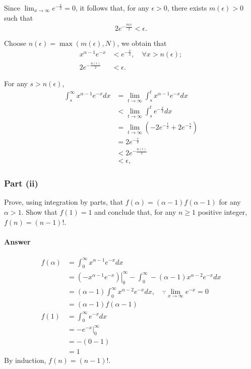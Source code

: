 Since $ \lim_{x \rightarrow \infty} e^{-\frac{x}{2}} = 0 $, it follows that,
    for any $ \epsilon > 0 $, there exists $ m(\epsilon) > 0 $ such that
\begin{equation*}
    2 e^{-\frac{m(\epsilon}{2}} < \epsilon.
\end{equation*}

Choose $ n(\epsilon) = \max (m(\epsilon), N) $, we obtain that
\begin{align*}
    x^{\alpha - 1} e^{-x} &< e^{-\frac{x}{2}}, \quad \forall x > n(\epsilon); \\
    2 e^{-\frac{n(\epsilon)}{2}} &< \epsilon.
\end{align*}

For any $ s > n(\epsilon) $,
\begin{align*}
    \int_{s}^{\infty} x^{\alpha - 1} e^{-x} dx
        &= \lim_{t \rightarrow \infty} \int_{s}^{t} x^{\alpha - 1} e^{-x} dx \\
        &< \lim_{t \rightarrow \infty} \int_{s}^{t} e^{-\frac{x}{2}} dx \\
        &= \lim_{t \rightarrow \infty} \left( -2 e^{-\frac{t}{2}} +
            2 e^{-\frac{s}{2}} \right) \\
        &= 2 e^{-\frac{s}{2}} \\
        &< 2 e^{-\frac{n(\epsilon)}{2}} \\
        &< \epsilon,
\end{align*}

\subsubsection{Part (ii)}
Prove, using integration by parts, that $ f(\alpha) = (\alpha - 1)
    f(\alpha - 1) $ for any $ \alpha > 1 $.
Show that $ f(1) = 1 $ and conclude that, for any $ n \geq 1 $ positive integer,
    $ f(n) = (n - 1)! $.

\paragraph{Answer}
\begin{align*}
    f(\alpha)
        &= \int_{0}^{\infty} x^{\alpha - 1} e^{-x} dx \\
        &= \left. \left( -x^{\alpha - 1} e^{-x} \right) \right|_{0}^{\infty} -
            \int_{0}^{\infty} -(\alpha - 1) x^{\alpha - 2} e^{-x} dx \\
        &= (\alpha - 1) \int_{0}^{\infty} x^{\alpha - 2} e^{-x} dx, \quad
            \because \lim_{x \rightarrow \infty} e^{-x} = 0 \\
        &= (\alpha - 1) f(\alpha - 1) \\
    f(1)
        &= \int_{0}^{\infty} e^{-x} dx \\
        &= -e^{-x} |_0^{\infty} \\
        &= -(0 - 1) \\
        &= 1
\end{align*}
By induction, $ f(n) = (n - 1)! $.

